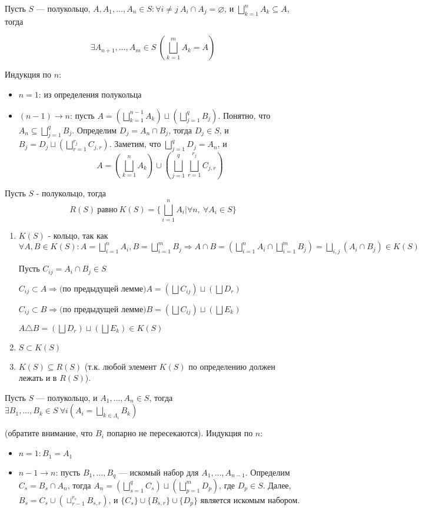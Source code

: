 \Lemma Пусть $S$ — полукольцо, $A, A_1, \dots, A_n \in S: \forall i \neq j\ A_i \cap A_j = \varnothing$, и $\bigsqcup^n_{k=1} A_k \subseteq A$, тогда

$$\exists A_{n+1}, \dots, A_m \in S\ ( \bigsqcup^m_{k=1} A_k = A)$$

\Proof Индукция по $n$:
\begin{itemize}
\item $n = 1$: из определения полукольца
\item $(n - 1) \rightarrow n$: пусть $A = (\bigsqcup^{n-1}_{k=1} A_k) \sqcup (\bigsqcup^q_{j=1} B_j)$. Понятно, что $A_n \subseteq \bigsqcup^q_{j=1} B_j$. Определим $D_j = A_n \cap B_j$, тогда $D_j \in S$, и $B_j = D_j \sqcup (\bigsqcup^{r_j}_{r=1} C_{j,r})$. Заметим, что $\bigsqcup^q_{j=1} D_j = A_n$, и
$$A = (\bigsqcup^{n}_{k=1} A_k) \cup (\bigsqcup^{q}_{j=1} \bigsqcup^{r_j}_{r=1} C_{j,r})$$ \EndProof 
\end{itemize}

\Th Пусть $S$ - полукольцо, тогда 
$$R(S)\ \text{равно}\ K(S) = \{\bigsqcup_{i=1}^n A_i | \forall n,\ \forall A_i \in S\}$$

\Proof
\begin{enumerate}
    \item $K(S)$ - кольцо, так как
$\forall A, B \in K(S): A = \bigsqcup^n_{i = 1} A_i, B = \bigsqcup^m_{i = 1} B_j \Rightarrow A \cap B = (\bigsqcup^n_{i = 1} A_i \cap \bigsqcup^m_{i = 1} B_j) = \bigsqcup_{i, j} (A_i \cap B_j) \in K(S)$

Пусть $C_{ij} = A_i \cap B_j \in S$

$C_{ij} \subset A \Rightarrow \text{(по предыдущей лемме)} A = (\bigsqcup C_{ij}) \sqcup (\bigsqcup D_{r})$

$C_{ij} \subset B \Rightarrow \text{(по предыдущей лемме)} B = (\bigsqcup C_{ij}) \sqcup (\bigsqcup E_{k})$

$A \triangle B = (\bigsqcup D_r) \sqcup (\bigsqcup E_k) \in K(S)$
    \item $S \subset K(S)$
    \item $K(S) \subseteq R(S)$ (т.к. любой элемент $K(S)$ по определению должен лежать и в $R(S)$).
\EndProof
\end{enumerate}

\leftbar

 Пусть $S$ — полукольцо, и $A_1, \dots, A_n \in S$, тогда $\exists B_1, \dots , B_k \in S \ \forall i (A_i = \bigsqcup_{k \in \Lambda_i} B_k)$

(обратите внимание, что $B_i$ попарно не пересекаются).
\Proof Индукция по $n$:
\begin{itemize}
\item $n = 1: B_1 = A_1$
\item $n - 1 \rightarrow n$: пусть $B_1, \dots, B_q$ — искомый набор для $A_1, \dots, A_{n-1}$. Определим $C_s = B_s \cap A_n$, тогда $A_n = (\bigsqcup^q_{s=1} C_s) \sqcup (\bigsqcup^m_{p=1} D_p)$, где $D_p \in S$. Далее, $B_s = C_s \cup (\sqcup_{r-1}^{r_s} B_{s,r})$, и $\{C_s\} \cup \{B_{s,r}\} \cup \{D_p\}$ является искомым набором. \EndProof
\end{itemize}
\endleftbar

